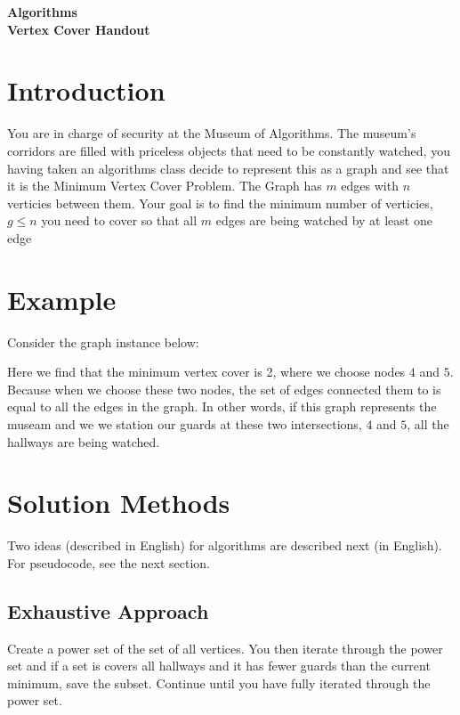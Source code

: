 \documentclass{article}
\begin{document}
\begin{center}
    \large\textbf{Algorithms}\\
    \Large\textbf{Vertex Cover Handout}
\end{center}

\section{Introduction}
You are in charge of security at the Museum of Algorithms. The museum's corridors are filled with priceless objects that need to be constantly watched, you having taken an algorithms class decide to represent this as a graph and see that it is the Minimum Vertex Cover Problem. The Graph has $m$ edges with $n$ verticies between them. Your goal is to find the minimum number of verticies, $g\leq n$ you need to cover so that all $m$ edges are being watched by at least one edge
\section{Example}
Consider the graph instance below: 

\begin{center}
    

\end{center}

Here we find that the minimum vertex cover is 2, where we choose nodes $4$ and $5$. Because when we choose these two nodes, the set of edges connected them to is equal to all the edges in the graph. In other words, if this graph represents the museam and we we station our guards at these two intersections, $4$ and $5$, all the hallways are being watched.

\section{Solution Methods}
Two ideas (described in English) for algorithms are described next (in English). For pseudocode, see the next section.
\subsection{Exhaustive Approach}
Create a power set of the set of all vertices. You then iterate through the power set and if a set is covers all hallways and it has fewer guards than the current minimum, save the subset. Continue until you have fully iterated through the power set.
\end{document}
